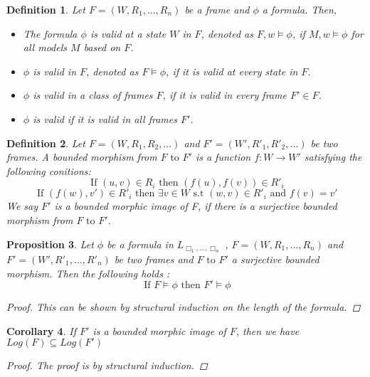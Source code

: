 \documentclass[12pt, a4paper]{scrartcl}
\newtheorem{definition}{Definition}[subsection]
\newtheorem{proposition}[definition]{Proposition}
\newtheorem{corollary}[definition]{Corollary}
\begin{document}
\begin{definition}
    Let $F = (W,R_1,...,R_n)$ be a frame and $\phi$ a formula. Then,
    \begin{itemize}
        \item The formula $\phi$ is valid at a state $W$ in $F$, denoted as $F, w \vDash \phi$, if $M,w \vDash \phi$ for all models $M$ based on $F$.
        \item $\phi$ is valid in $F$, denoted as $F \vDash \phi$, if it is valid at every state in $F$.
        \item $\phi$ is valid in a class of frames $F$, if it is valid in every frame $F' \in F$.
        \item $\phi$ is valid if it is valid in all frames $F'$.
    \end{itemize}
\end{definition}

\begin{definition}
    Let $F = (W,R_1, R_2, ...)$ and $F' = (W', R'_1, R'_2, ...)$ be two frames. A bounded morphism from $F \mbox{ to } F'$ is a function
    $f : W \rightarrow W'$ satisfying the following conitions: 
    $$ \mbox{ If } (u,v) \in R_i  \mbox{ then }(f(u), f(v)) \in R'_i $$
    $$ \mbox{ If } (f(w), v') \in R'_i \mbox{ then } \exists v \in W \mbox{ s.t } (w,v) \in R'_i \mbox{ and } f(v) = v'$$
    We say $F'$ is a bounded morphic image of F, if there is a surjective bounded morphism from $F \mbox{ to } F'$.
        
\end{definition}

\begin{proposition}
    Let $\phi$ be a formula in $L_{\Box_1,...,\Box_n}$ , $F = (W, R_1,...,R_n)$ and $F' = (W', R'_1,...,R'_n)$ be two frames and $F \mbox{ to } F'$ a surjective bounded morphism. Then the following holds :
    $$ \mbox{ If }F \vDash \phi \mbox{ then } F' \vDash \phi$$
    \begin{proof}
            This can be shown by structural induction on the length of the formula.
    \end{proof}
        
\end{proposition}

\begin{corollary}
    If $F'$ is a bounded morphic image of $F$, then we have $Log(F) \subseteq Log(F')$
    \begin{proof}
        The proof is by structural induction.
        
    \end{proof}
\end{corollary}
\end{document}
